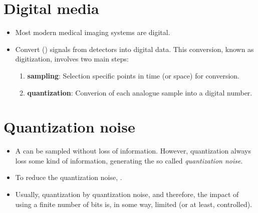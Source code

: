 \section{Digital media}
\begin{itemize}
\item Most modern medical imaging systems are digital.
\item Convert  () signals from detectors into
  digital data. This conversion, known as digitization, involves two
  main steps:
  \begin{enumerate}
  \item \textbf{sampling}: Selection specific points in time (or
    space) for conversion.
  \item \textbf{quantization}: Converion of each analogue sample into a
    digital number.
  \end{enumerate}
\end{itemize}

\section{Quantization noise}
\begin{itemize}
\item A  can be sampled without
  loss of information. However, quantization always loss some kind of
  information, generating the so called \emph{quantization noise}.
\item To reduce the quantization noise,  \cite{bushberg2011essential}.
\item Usually, quantization  by quantization noise, and therefore,
  the impact of using a finite number of bits is, in some way, limited
  (or at least, controlled).
\end{itemize}